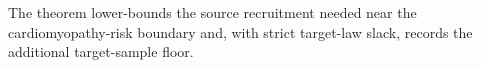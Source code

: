 The theorem lower-bounds the source recruitment needed near the cardiomyopathy-risk boundary and, with strict target-law slack, records the additional target-sample floor.